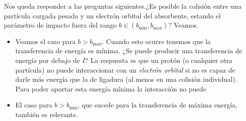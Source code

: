 \begin{enumerate}[label=\alph*)]
    Nos queda responder a las preguntas siguientes.¿Es posible la colisión entre una partícula cargada pesada y un electrón orbital del absorbente, estando el parámetro de impacto fuera del rango $b \in (b_{\min}, b_{\max})$? Veamos. 
    \begin{itemize}
        \item Veamos el caso para $b>b_{\max}$. Cuando esto ocurre tenemos que la transferencia de energía es mínima. ¿Se puede producir una transferencia de energía por debajo de $I$? La respuesta es que un protón (o cualquier otra partícula) no puede interaccionar con un \textit{electrón orbital} si no es capaz de darle más energía que la de ligadura (al menos en una colisión individual). Para poder aportar esta energía mínima la interacción no puede 
        \item El caso para $b>b_{\min}$, que sucede para la transferencia de máxima energía, también es relevante. 
    \end{itemize}

\end{enumerate}

